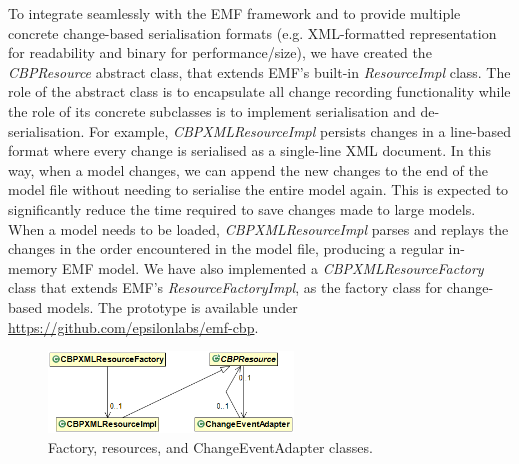 \documentclass{llncs}
\begin{document}
To integrate seamlessly with the EMF framework and to provide multiple concrete change-based serialisation formats (e.g. XML-formatted representation for readability and binary for performance/size), we have created the \emph{CBPResource} abstract class, that extends EMF's built-in \emph{ResourceImpl} class. The role of the abstract class is to encapsulate all change recording functionality while the role of its concrete subclasses is to implement serialisation and de-serialisation. For example, \emph{CBPXMLResourceImpl} persists changes in a line-based format where every change is serialised as a single-line XML document. In this way, when a model changes, we can append the new changes to the end of the model file without needing to serialise the entire model again. This is expected to significantly reduce the time required to save changes made to large models. When a model needs to be loaded, \emph{CBPXMLResourceImpl} parses and replays the changes in the order encountered in the model file, producing a regular in-memory EMF model. We have also implemented a \emph{CBPXMLResourceFactory} class that extends EMF's \emph{ResourceFactoryImpl}, as the factory class for change-based models. The prototype is available under \url{https://github.com/epsilonlabs/emf-cbp}.



\begin{figure}[th]
\centering
\includegraphics[width=6.5cm]{resources}
\caption{Factory, resources, and ChangeEventAdapter classes. }
\label{resources}
\end{figure}
\end{document}
